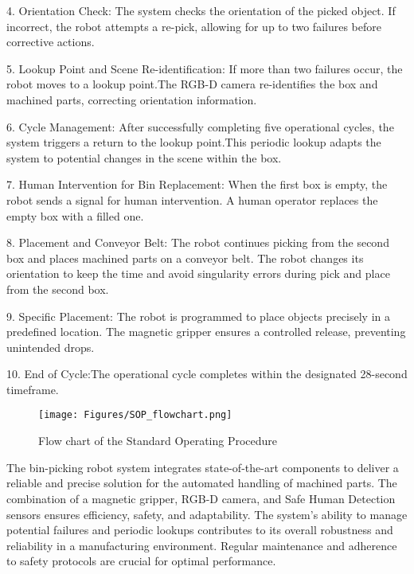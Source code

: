 {4. Orientation Check: The system checks the orientation of the picked object. If incorrect, the robot attempts a re-pick, allowing for up to two failures before corrective actions.

5. Lookup Point and Scene Re-identification: If more than two failures occur, the robot moves to a lookup point.The RGB-D camera re-identifies the box and machined parts, correcting orientation information.

6. Cycle Management: After successfully completing five operational cycles, the system triggers a return to the lookup point.This periodic lookup adapts the system to potential changes in the scene within the box.

7. Human Intervention for Bin Replacement: When the first box is empty, the robot sends a signal for human intervention. A human operator replaces the empty box with a filled one.

8. Placement and Conveyor Belt: The robot continues picking from the second box and places machined parts on a conveyor belt. The robot changes its orientation to keep the time and avoid singularity errors during pick and place from the second box.

9. Specific Placement: The robot is programmed to place objects precisely in a predefined location. The magnetic gripper ensures a controlled release, preventing unintended drops.

10. End of Cycle:The operational cycle completes within the designated 28-second timeframe.

\begin{figure}
    \centering
    \begin{minipage}{0.8\linewidth}
    \centering
        \texttt{[image: Figures/SOP\_flowchart.png]}
    \end{minipage}
    \label{fig:enter-label}
    \caption{Flow chart of the Standard Operating Procedure}
\end{figure}

The bin-picking robot system integrates state-of-the-art components to deliver a reliable and precise solution for the automated handling of machined parts. The combination of a magnetic gripper, RGB-D camera, and Safe Human Detection sensors ensures efficiency, safety, and adaptability. The system's ability to manage potential failures and periodic lookups contributes to its overall robustness and reliability in a manufacturing environment. Regular maintenance and adherence to safety protocols are crucial for optimal performance.

}
